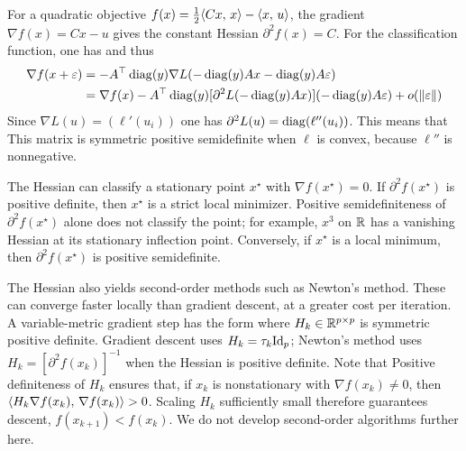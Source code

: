 For a quadratic objective $f(x)=\frac12\langle Cx,\,x\rangle-\langle x,\,u\rangle$, the gradient $\nabla f(x) = Cx-u$ gives the constant Hessian $\partial^2 f(x) = C$.
%
For the classification function, one has 
and thus
\begin{align*}
	\nabla f(x+\varepsilon) &= -A^\top \operatorname{diag}(y) \nabla L( -\operatorname{diag}(y) Ax-\operatorname{diag}(y)A\varepsilon)  \\
		&= \nabla f(x)  -A^\top \operatorname{diag}(y) [\partial^2 L( -\operatorname{diag}(y) Ax)]( -\operatorname{diag}(y) A\varepsilon) + o(\lVert\varepsilon\rVert)
\end{align*}
Since $\nabla L(u) = (\ell'(u_i))$ one has $\partial^2 L(u)=\operatorname{diag}(\ell''(u_i))$. This means that 
This matrix is symmetric positive semidefinite when $\ell$ is convex, because $\ell''$ is nonnegative.

\begin{rem}
The Hessian can classify a stationary point $x^\star$ with $\nabla f(x^\star)=0$. If $\partial^2 f(x^\star)$ is positive definite, then $x^\star$ is a strict local minimizer.
%
Positive semidefiniteness of $\partial^2 f(x^\star)$ alone does not classify the point; for example, $x^3$ on $\mathbb{R}$ has a vanishing Hessian at its stationary inflection point.
%
Conversely, if $x^\star$ is a local minimum, then $\partial^2 f(x^\star)$ is positive semidefinite.
\end{rem}

\begin{rem}
The Hessian also yields second-order methods such as Newton's method. These can converge faster locally than gradient descent, at a greater cost per iteration. A variable-metric gradient step has the form
where $H_k \in \mathbb{R}^{p \times p}$ is symmetric positive definite. Gradient descent uses $H_k=\tau_k \mathrm{Id}_p$; Newton's method uses $H_k=[\partial^2 f(x_k)]^{-1}$ when the Hessian is positive definite.
%
Note that
Positive definiteness of $H_k$ ensures that, if $x_k$ is nonstationary with $\nabla f(x_k)\neq0$, then $\langle H_k \nabla f(x_k),\,\nabla f(x_k)\rangle>0$.
%
Scaling $H_k$ sufficiently small therefore guarantees descent, $f(x_{k+1}) < f(x_k)$.
%
We do not develop second-order algorithms further here.
\end{rem}

